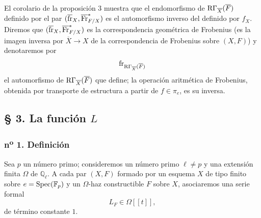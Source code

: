 El corolario de la proposición 3 muestra que el endomorfismo de $\mathrm R\Gamma_{\overline X}(\overline F)$ definido por el par $(\overline{\operatorname{fr}}_X,\overline{\operatorname{Fr}}^*_{F/X})$ es el automorfismo inverso del definido por $f_X$. Diremos que $(\overline{\operatorname{fr}}_X,\overline{\operatorname{Fr}}^*_{F/X})$ es la correspondencia geométrica de Frobenius (es la imagen inversa por $\overline X\to X$ de la correspondencia de Frobenius sobre $(X,F)$) y denotaremos por
\[
\operatorname{fr}_{\mathrm R\Gamma_{\overline X}(\overline F)}
\]
el automorfismo de $\mathrm R\Gamma_{\overline X}(\overline F)$ que define; la operación aritmética de Frobenius, obtenida por transporte de estructura a partir de $f\in\pi_e$, es su inversa.

\subsection*{§ 3. La función $L$}

\subsubsection*{n\textsuperscript{o} 1. Definición}

Sea $p$ un número primo; consideremos un número primo $\ell\ne p$ y una extensión finita $\Omega$ de $\mathbb Q_\ell$. A cada par $(X,F)$ formado por un esquema $X$ de tipo finito sobre $e=\operatorname{Spec}(\mathbb F_p)$ y un $\Omega$-haz constructible $F$ sobre $X$, asociaremos una serie formal
\[
L_F\in\Omega[[t]],
\]
de término constante $1$.


